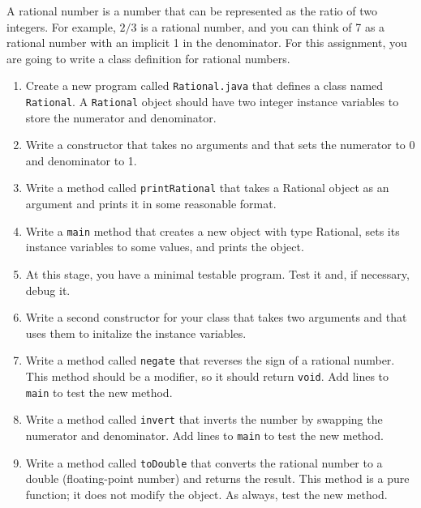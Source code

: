 \begin{exercise}
\label{ex.rational}

A rational number is a number that can be represented as the ratio of
two integers.  For example, $2/3$ is a rational number, and you can
think of 7 as a rational number with an implicit 1 in the denominator.
For this assignment, you are going to write a class definition for
rational numbers.

\begin{enumerate}

\item Create a new program called {\tt Rational.java} that defines a
class named {\tt Rational}.  A {\tt Rational} object should have two
integer instance variables to store the numerator and denominator.

\item Write a constructor that takes no arguments and that sets the
numerator to 0 and denominator to 1.

\item Write a method called {\tt printRational} that takes
a Rational object as an argument and prints it in some
reasonable format.

\item Write a {\tt main} method that creates a new object with
type Rational, sets its instance variables to some values, and prints
the object.

\item At this stage, you have a minimal testable
program.  Test it and, if necessary, debug it.

\item Write a second constructor for your class that takes two
arguments and that uses them to initalize the instance
variables.

\item Write a method called {\tt negate} that reverses the sign of
a rational number.  This method should be a modifier, so it should
return {\tt void}.  Add lines to {\tt main} to test the new method.

\item Write a method called {\tt invert} that inverts the number by
  swapping the numerator and denominator.  Add lines to {\tt main} to
  test the new method.

\item Write a method called {\tt toDouble} that converts the rational
number to a double (floating-point number) and returns the result.
This method is a pure function; it does not modify the object.
As always, test the new method.


\end{enumerate}
\end{exercise}
